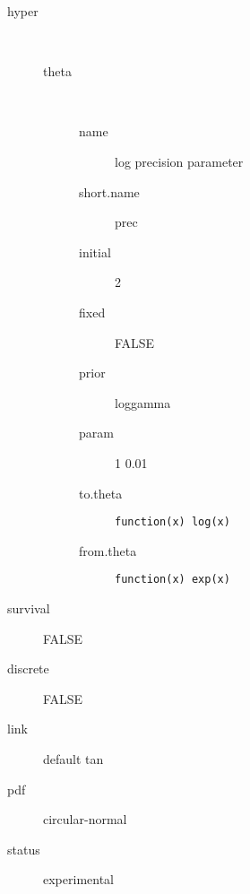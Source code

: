 \begin{description}
	\item[hyper]\ 
	 \begin{description}
	 	\item[theta]\ 
	 	 \begin{description}
	 	 	\item[name] log precision parameter
	 	 	\item[short.name] prec
	 	 	\item[initial] 2
	 	 	\item[fixed] FALSE
	 	 	\item[prior] loggamma
	 	 	\item[param] 1 0.01
	 	 	\item[to.theta] \verb|function(x) log(x)|
	 	 	\item[from.theta] \verb|function(x) exp(x)|
	 	 \end{description}
	 \end{description}
	\item[survival] FALSE
	\item[discrete] FALSE
	\item[link] default tan
	\item[pdf] circular-normal
	\item[status] experimental
\end{description}
